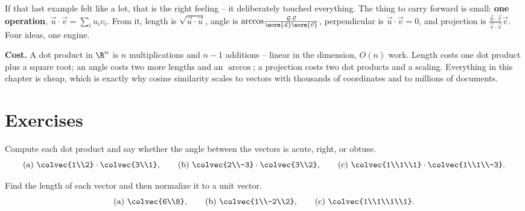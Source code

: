 \begin{recoverybox}
If that last example felt like a lot, that is the right feeling -- it deliberately
touched everything. The thing to carry forward is small: \textbf{one operation},
$\vec u\cdot\vec v = \sum_i u_iv_i$. From it, length is $\sqrt{\vec u\cdot\vec u}$,
angle is $\arccos\!\frac{\vec u\cdot\vec v}{\norm{\vec u}\norm{\vec v}}$,
perpendicular is $\vec u\cdot\vec v = 0$, and projection is
$\frac{\vec u\cdot\vec v}{\vec v\cdot\vec v}\vec v$. Four ideas, one engine.

\textbf{Cost.} A dot product in $\R^n$ is $n$ multiplications and $n-1$ additions --
linear in the dimension, $O(n)$ work. Length costs one dot product plus a square
root; an angle costs two more lengths and an $\arccos$; a projection costs two dot
products and a scaling. Everything in this chapter is cheap, which is exactly why
cosine similarity scales to vectors with thousands of coordinates and to millions of
documents.
\end{recoverybox}

\section{Exercises}

\begin{exercise}\label{ch04:ex-warmup}
Compute each dot product and say whether the angle between the vectors is acute,
right, or obtuse.
\[
  \text{(a) } \colvec{1\\2}\cdot\colvec{3\\1},\qquad
  \text{(b) } \colvec{2\\-3}\cdot\colvec{3\\2},\qquad
  \text{(c) } \colvec{1\\1\\1}\cdot\colvec{1\\1\\-3}.
\]
\end{exercise}

\begin{exercise}
Find the length of each vector and then normalize it to a unit vector.
\[
  \text{(a) } \colvec{6\\8}, \qquad
  \text{(b) } \colvec{1\\-2\\2}, \qquad
  \text{(c) } \colvec{1\\1\\1\\1}.
\]
\end{exercise}

